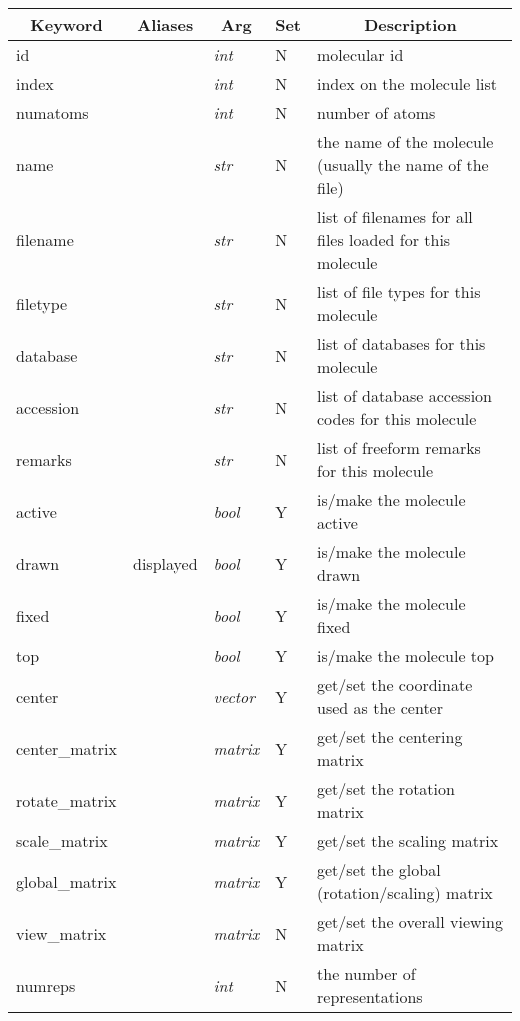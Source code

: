 \begin{table}[htp]
 \hspace{0.5in}
  \begin{tabular}{|l|l|l|l|l|} \hline
    \multicolumn{1}{|c}{Keyword} &
    \multicolumn{1}{|c}{Aliases} &
    \multicolumn{1}{|c}{Arg} &
    \multicolumn{1}{|c}{Set} &
    \multicolumn{1}{|c|}{Description} \\ \hline\hline
id      & & {\it int} & N & molecular id                        \\
index   & & {\it int} & N & index on the molecule list          \\
numatoms& & {\it int} & N & number of atoms                     \\
name    & & {\it str} & N & the name of the molecule (usually the name of the file) \\
filename& & {\it str} & N & list of filenames for all files loaded for this molecule \\
filetype & & {\it str} & N & list of file types for this molecule \\
database & & {\it str} & N & list of databases for this molecule \\
accession& & {\it str} & N & list of database accession codes for this molecule \\
remarks  & & {\it str} & N & list of freeform remarks for this molecule \\
active  & & {\it bool} & Y & is/make the molecule active         \\
drawn   & displayed & {\it bool} & Y & is/make the molecule drawn \\
fixed   & & {\it bool} & Y & is/make the molecule fixed         \\
top     & & {\it bool} & Y & is/make the molecule top           \\
center  & & {\it vector} & Y & get/set the coordinate used as the center \\
center\_matrix & & {\it matrix} & Y & get/set the centering matrix      \\
rotate\_matrix & & {\it matrix} & Y & get/set the rotation matrix       \\
scale\_matrix & & {\it matrix} & Y & get/set the scaling matrix         \\
global\_matrix & & {\it matrix} & Y & get/set the global (rotation/scaling) matrix \\
view\_matrix  & & {\it matrix} & N & get/set the overall viewing matrix \\
numreps & & {\it int} & N & the number of representations       \\

\end{tabular}
\end{table}
